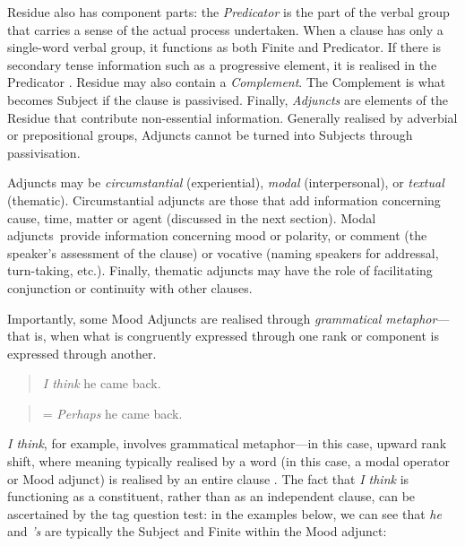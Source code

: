 Residue also has component parts: the \emph{Predicator} is the part of the verbal group that carries a sense of the actual process undertaken. When a clause has only a single-word verbal group, it functions as both Finite and Predicator. If there is secondary tense information such as a progressive element, it is realised in the Predicator \cite{halliday_introduction_2004}. Residue may also contain a \emph{Complement}. The Complement is what becomes Subject if the clause is passivised. Finally, \emph{Adjuncts} are elements of the Residue that contribute non-essential information. Generally realised by adverbial or prepositional groups, Adjuncts cannot be turned into Subjects through passivisation.

Adjuncts may be \emph{circumstantial} (experiential), \emph{modal} (interpersonal), or \emph{textual} (thematic). Circumstantial adjuncts are those that add information concerning cause, time, matter or agent (discussed in the next section). Modal adjuncts~provide information concerning mood or polarity, or comment (the speaker's assessment of the clause) or vocative (naming speakers for addressal, turn\hyp{}taking, etc.). Finally, thematic adjuncts may have the role of facilitating conjunction or continuity with other clauses.

Importantly, some Mood Adjuncts are realised through \emph{grammatical metaphor}---that is, when what is congruently expressed through one rank or component is expressed through another.
%
\begin{multicols}{2}
\begin{quote}

\emph{I think} he came back.
\end{quote}

\begin{quote}

= \emph{Perhaps} he came back.
\end{quote}
\end{multicols}
%
\noindent \emph{I think}, for example, involves grammatical metaphor---in this case, upward rank shift, where meaning typically realised by a word (in this case, a modal operator or Mood adjunct) is realised by an entire clause \cite{halliday_concept_1966,taverniers_systemic-functional_2002}. The fact that \emph{I think} is functioning as a constituent, rather than as an independent clause, can be ascertained by the tag question test: in the examples below, we can see that \emph{he} and \emph{'s} are typically the Subject and Finite within the Mood adjunct:

